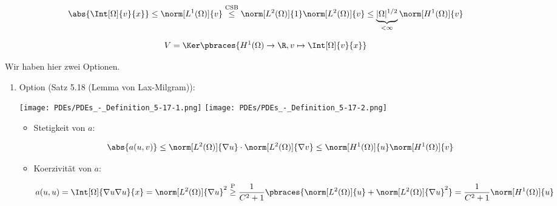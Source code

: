 \begin{solution}
\begin{enumerate}[label = \alph*)]
    \begin{align*}
        \abs{\Int[\Omega]{v}{x}}
        \leq
        \norm[L^1(\Omega)]{v}
        \stackrel
        {
            \mathrm{CSB}
        }{\leq}
        \norm[L^2(\Omega)]{1} \norm[L^2(\Omega)]{v}
        \leq
        \underbrace{|\Omega|^{1/2}}_{<\infty} \norm[H^1(\Omega)]{v}
    \end{align*}

    \begin{align*}
        V = \Ker \pbraces{H^1(\Omega) \to \R, v \mapsto \Int[\Omega]{v}{x}}
    \end{align*}

    Wir haben hier zwei Optionen.

    \begin{enumerate}[label = \arabic*.]

        \item Option (Satz 5.18 (Lemma von Lax-Milgram)):

        \begin{center}
            \texttt{[image: PDEs/PDEs\_-\_Definition\_5-17-1.png]}
            \texttt{[image: PDEs/PDEs\_-\_Definition\_5-17-2.png]}
        \end{center}


        \begin{itemize}

            \item Stetigkeit von $a$:

            \begin{align*}
                \abs{a(u, v)}
                \leq
                \norm[L^2(\Omega)]{\nabla u} \cdot \norm[L^2(\Omega)]{\nabla v}
                \leq
                \norm[H^1(\Omega)]{u} \norm[H^1(\Omega)]{v}
            \end{align*}

            \item Koerzivität von $a$:

            \begin{align*}
                a(u, u)
                =
                \Int[\Omega]{\nabla u \nabla u}{x}
                =
                \norm[L^2(\Omega)]{\nabla u}^2
                \stackrel
                {
                    \mathrm{P}
                }{\geq}
                \frac{1}{C^2 + 1}
                \pbraces
                {
                   \norm[L^2(\Omega)]{u} + \norm[L^2(\Omega)]{\nabla u}^2
                }
                =
                \frac{1}{C^2 + 1} \norm[H^1(\Omega)]{u}
            \end{align*}


\end{itemize}
\end{enumerate}
\end{enumerate}
\end{solution}
